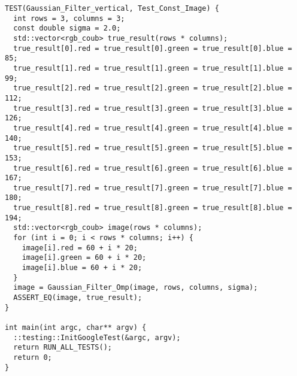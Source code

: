 \documentclass{report}
\begin{document}
\begin{lstlisting}
TEST(Gaussian_Filter_vertical, Test_Const_Image) {
  int rows = 3, columns = 3;
  const double sigma = 2.0;
  std::vector<rgb_coub> true_result(rows * columns);
  true_result[0].red = true_result[0].green = true_result[0].blue = 85;
  true_result[1].red = true_result[1].green = true_result[1].blue = 99;
  true_result[2].red = true_result[2].green = true_result[2].blue = 112;
  true_result[3].red = true_result[3].green = true_result[3].blue = 126;
  true_result[4].red = true_result[4].green = true_result[4].blue = 140;
  true_result[5].red = true_result[5].green = true_result[5].blue = 153;
  true_result[6].red = true_result[6].green = true_result[6].blue = 167;
  true_result[7].red = true_result[7].green = true_result[7].blue = 180;
  true_result[8].red = true_result[8].green = true_result[8].blue = 194;
  std::vector<rgb_coub> image(rows * columns);
  for (int i = 0; i < rows * columns; i++) {
    image[i].red = 60 + i * 20;
    image[i].green = 60 + i * 20;
    image[i].blue = 60 + i * 20;
  }
  image = Gaussian_Filter_Omp(image, rows, columns, sigma);
  ASSERT_EQ(image, true_result);
}

int main(int argc, char** argv) {
  ::testing::InitGoogleTest(&argc, argv);
  return RUN_ALL_TESTS();
  return 0;
}

\end{lstlisting}
\end{document}
